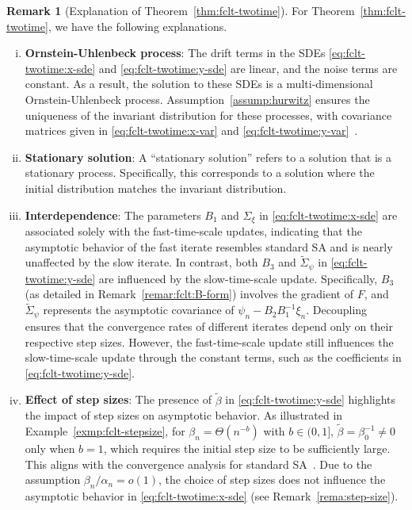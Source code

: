 \documentclass[11pt]{article}
\theoremstyle{plain}
\theoremstyle{definition}
\newtheorem{rema}{Remark}[section]
\def\invdiffslow{\tilde{\beta}}
\begin{document}
\begin{rema}[Explanation of Theorem~\ref{thm:fclt-twotime}]\label{rema:fclt}
	For Theorem~\ref{thm:fclt-twotime}, we have the following explanations.
	\begin{enumerate}[(i)]
		\item \textbf{Ornstein-Uhlenbeck process}: 
		The drift terms in the SDEs \eqref{eq:fclt-twotime:x-sde} and \eqref{eq:fclt-twotime:y-sde} are linear, and the noise terms are constant. 
		As a result, the solution to these SDEs is a multi-dimensional Ornstein-Uhlenbeck process. Assumption~\ref{assump:hurwitz} ensures the uniqueness of the invariant distribution for these processes, with covariance matrices given in \eqref{eq:fclt-twotime:x-var} and \eqref{eq:fclt-twotime:y-var}~\citep[Section~6.5]{risken1996fokker}.
		
		\item \textbf{Stationary solution}:
		A ``stationary solution'' refers to a solution that is a stationary process. Specifically, this corresponds to a solution where the initial distribution matches the invariant distribution.
		
		\item \textbf{Interdependence}: The parameters $B_1$ and $\Sigma_{\xi}$ in \eqref{eq:fclt-twotime:x-sde} are associated solely with the fast-time-scale updates, indicating that the asymptotic behavior of the fast iterate resembles standard SA and is nearly unaffected by the slow iterate.
		In contrast, both $B_3$ and $\widetilde{\Sigma}_{\psi}$ in \eqref{eq:fclt-twotime:y-sde} are influenced by the slow-time-scale update.
		Specifically, $B_3$ (as detailed in Remark~\ref{remar:fclt:B-form}) involves the gradient of $F$, and $\widetilde{\Sigma}_{\psi}$ represents the asymptotic covariance of $\psi_{n} - B_2 B_1^{-1} \xi_{n}$.
		Decoupling ensures that the convergence rates of different iterates depend only on their respective step sizes. However, the fast-time-scale update still influences the slow-time-scale update through the constant terms, such as the coefficients in \eqref{eq:fclt-twotime:y-sde}.
		
		\item \textbf{Effect of step sizes}: The presence of $\invdiffslow$ in \eqref{eq:fclt-twotime:y-sde} highlights the impact of step sizes on asymptotic behavior. As illustrated in Example~\ref{exmp:fclt-stepsize}, for $\beta_{n} = \Theta(n^{-b})$ with $b \in (0,1]$, $\invdiffslow = \beta_{0}^{-1} \neq 0$ only when $b=1$, which requires the initial step size to be sufficiently large. This aligns with the convergence analysis for standard SA~\citep{moulines2011non}.
		Due to the assumption $\beta_{n} / \alpha_{n} = o(1)$, the choice of step sizes does not influence the asymptotic behavior in \eqref{eq:fclt-twotime:x-sde} (see Remark~\ref{rema:step-size}).
	\end{enumerate}
\end{rema}
\end{document}
